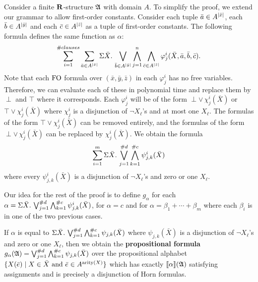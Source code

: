 Consider a finite $\mathbf{R}$-structure $\mathfrak{A}$ with domain $A$. To simplify the proof, we extend our grammar to allow first-order constants. Consider each tuple $\bar{a}\in A^{\vert \bar{x} \vert}$, each $\bar{b}\in A^{\vert \bar{y} \vert}$ and each $\bar{c}\in A^{\vert \bar{z} \vert}$ as a tuple of first-order constants. The following formula defines the same function as $\alpha$:
$$
\sum_{i = 1}^{\#clauses} \sum_{\bar{a}\in A^{\vert \bar{x} \vert}} \Sigma{\bar{X}}.\,\bigvee_{\bar{b}\in A^{\vert \bar{y} \vert}}\bigwedge_{j = 1}^{n}\bigwedge_{\bar{c}\in A^{\vert \bar{z} \vert}}\varphi^i_j(\bar{X},\bar{a},\bar{b},\bar{c}).
$$
Note that each ${\rm FO}$ formula over $(\bar{x},\bar{y},\bar{z})$ in each $\varphi^i_j$ has no free variables. Therefore, we can evaluate each of these in polynomial time and replace them by $\perp$ and $\top$ where it corresponds. Each $\varphi^i_j$ will be of the form $\perp \vee\, \chi^i_j(\bar{X})$ or $\top \vee \chi^i_j(\bar{X})$ where $\chi^i_j$ is a disjunction of $\neg X_{\ell}$'s and at most one $X_{\ell}$. The formulas of the form $\top \vee \chi^i_j(\bar{X})$ can be removed entirely, and the formulas of the form $\perp \vee\, \chi^i_j(\bar{X})$ can be replaced by $\chi^i_j(\bar{X})$. We obtain the formula
$$
\sum_{i = 1}^{m}\Sigma{\bar{X}}.\,\bigvee_{j = 1}^{\#d}\bigwedge_{k = 1}^{\#c}\psi^{i}_{j,k}(\bar{X})
$$
where every $\psi^{i}_{j,k}(\bar{X})$ is a disjunction of $\neg X_{\ell}$'s and zero or one $X_{\ell}$.

Our idea for the rest of the proof is to define $g_{\alpha}$ for each $\alpha = \Sigma{\bar{X}}.\,\bigvee_{j = 1}^{\#d}\bigwedge_{k = 1}^{\#c}\psi^{i}_{j,k}(\bar{X})$, for $\alpha = c$ and for $\alpha = \beta_1 + \cdots + \beta_m$ where each $\beta_i$ is in one of the two previous cases.

If $\alpha$ is equal to $\Sigma{\bar{X}}.\,\bigvee_{j = 1}^{\#d}\bigwedge_{k = 1}^{\#c}\psi_{j,k}(\bar{X})$ where $\psi_{j,k}(\bar{X})$ is a disjunction of $\neg X_{\ell}$'s and zero or one $X_{\ell}$, then we obtain the {\bf propositional formula} $g_{\alpha}(\mathfrak{A}) = \bigvee_{j = 1}^{\#d}\bigwedge_{k = 1}^{\#c}\psi_{j,k}(\bar{X})$ over the propositional alphabet $\{X(\bar{e}) \mid X \in \bar{X} \text{ and } \bar{e}\in A^{{\rm arity}(X)} \}$ which has exactly ${\llbracket{}{\alpha}\rrbracket}(\mathfrak{A})$ satisfying assignments and is precisely a disjunction of Horn formulas.

